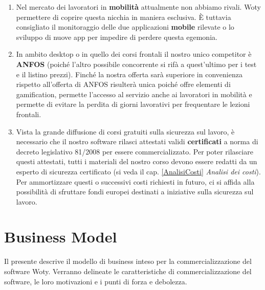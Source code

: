 \begin{enumerate}
	\item Nel mercato dei lavoratori in \textbf{mobilità} attualmente non abbiamo rivali. Woty permettere di coprire questa nicchia in maniera esclusiva. È tuttavia consigliato il monitoraggio delle due applicazioni \textbf{mobile} rilevate o lo sviluppo di nuove app per impedire di perdere questa egemonia.
	
	\item In ambito desktop o in quello dei corsi frontali il nostro unico competitor è \textbf{ANFOS} (poiché l'altro possibile concorrente si rifà a quest'ultimo per i test e il listino prezzi). Finché la nostra offerta sarà superiore in convenienza rispetto all'offerta di ANFOS risulterà unica poiché offre elementi di gamification, permette l'accesso al servizio anche ai lavoratori in mobilità e permette di evitare la perdita di giorni lavorativi per frequentare le lezioni frontali.
	
	\item Vista la grande diffusione di corsi gratuiti sulla sicurezza sul lavoro, è necessario che il nostro software rilasci attestati validi \textbf{certificati} a norma di decreto legislativo 81/2008 per essere commercializzato.
Per poter rilasciare questi attestati, tutti i materiali del nostro corso devono essere redatti da un esperto di sicurezza certificato (si veda il cap. \ref{AnalisiCosti} \textit{Analisi dei costi}).\\
Per ammortizzare questi o successivi costi richiesti in futuro, ci si affida alla possibilità di sfruttare fondi europei destinati a iniziative sulla sicurezza sul lavoro.

\end{enumerate}








\chapter{Business Model}

Il presente descrive il modello di business inteso per la commercializzazione del software Woty. Verranno delineate le caratteristiche di commercializzazione del software, le loro motivazioni e i punti di forza e debolezza.

